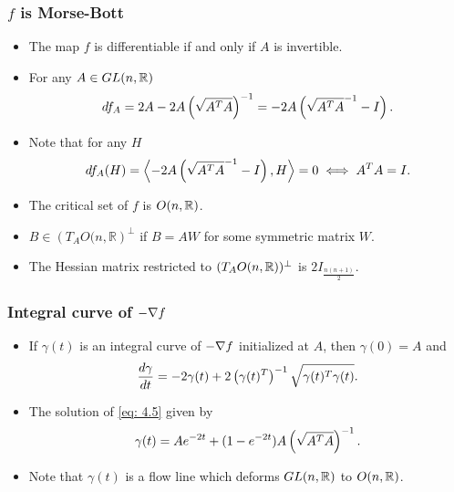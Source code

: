\documentclass{beamer}
\begin{document}
	\begin{frame}
		\frametitle<presentation>{$f$ is Morse-Bott}
		\begin{itemize}
			\p \item The map $f$ is differentiable if and only if $A$ is invertible.
			\p \item For  any $A\in GL(n,\mathbb{R})$
				\begin{equation*}
				 df_A  = 2A-2A\left( \sqrt{A^TA} \right)^{-1}=-2A \left( \sqrt{A^TA}^{-1}-I \right).
				\end{equation*}
				\p \item Note that for any $H$
			\begin{align*}
				df_A(H) = \left\langle -2A \left( \sqrt{A^TA}^{-1}-I \right),H\right\rangle = 0 \iff A^TA = I.
			\end{align*}
			\p \item The critical set of $f$ is $O(n,\mathbb{R})$. 
			\p \item $B\in \left(T_AO(n,\mathbb{R}\right)^\perp$ if $B=AW$ for some symmetric matrix $W$.
			\p \item The Hessian matrix restricted to $(T_A O(n,\mathbb{R}))^\perp$ is $2I_{\frac{n(n+1)}{2}}$.
		\end{itemize}
	\end{frame}	


	\begin{frame}
		\frametitle<presentation>{Integral curve of $-\nabla f$}
		\begin{itemize}
			\p \item If $\gamma(t)$ is an integral curve of $-\nabla f$ initialized at $A$, then $\gamma(0)=A$ \p and 
			\begin{equation}
			\dfrac{d\gamma}{dt} = -2\gamma(t)+2\left( \gamma(t)^T \right)^{-1}\sqrt{\gamma(t)^T\gamma(t)} \label{eq: 4.5}.
			\end{equation}
			\p \item The solution of \eqref{eq: 4.5} given by
			\p 
			\begin{equation}\label{eq: 4.6}
			\gamma(t) = Ae^{-2t} + (1-e^{-2t})A\left( \sqrt{A^TA} \right)^{-1}.
			\end{equation} 
			\p \item Note that $\gamma(t)$ is a flow line which deforms $GL(n,\mathbb{R})$ to $O(n,\mathbb{R})$.
		\end{itemize}
	\end{frame}
\end{document}
